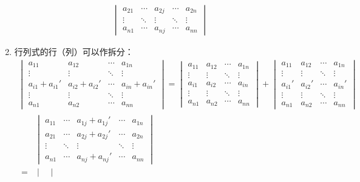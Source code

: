 \begin{property}
\begin{enumerate}
\begin{gather*}
\begin{vmatrix}
				a_{21} & \cdots & a_{2j} & \cdots & a_{2n} \\
				\vdots & \ddots & \vdots & \ddots & \vdots \\
				a_{n1} & \cdots & a_{nj} & \cdots & a_{nn}
			\end{vmatrix}
		\end{gather*}
		\item 行列式的行（列）可以作拆分：
		\begin{gather*}
			\begin{vmatrix}
				a_{11} & a_{12} & \cdots & a_{1n} \\
				\vdots & \vdots & \ddots & \vdots \\
				a_{i1}+a_{i1}' & a_{i2}+a_{i2}' & \cdots & a_{in}+a_{in}' \\
				\vdots & \vdots & \ddots & \vdots \\
				a_{n1} & a_{n2} & \cdots & a_{nn}
			\end{vmatrix}=
			\begin{vmatrix}
				a_{11} & a_{12} & \cdots & a_{1n} \\
				\vdots & \vdots & \ddots & \vdots \\
				a_{i1} & a_{i2} & \cdots & a_{in} \\
				\vdots & \vdots & \ddots & \vdots \\
				a_{n1} & a_{n2} & \cdots & a_{nn}
			\end{vmatrix}+
			\begin{vmatrix}
				a_{11} & a_{12} & \cdots & a_{1n} \\
				\vdots & \vdots & \ddots & \vdots \\
				a_{i1}' & a_{i2}' & \cdots & a_{in}' \\
				\vdots & \vdots & \ddots & \vdots \\
				a_{n1} & a_{n2} & \cdots & a_{nn}
			\end{vmatrix} \\
			\begin{aligned}
				&\begin{vmatrix}
					a_{11} & \cdots & a_{1j}+a_{1j}' & \cdots & a_{1n} \\
					a_{21} & \cdots & a_{2j}+a_{2j}' & \cdots & a_{2n} \\
					\vdots & \ddots & \vdots & \ddots & \vdots \\
					a_{n1} & \cdots & a_{nj}+a_{nj}' & \cdots & a_{nn}
				\end{vmatrix} \\
				=&
				\begin{vmatrix}

\end{vmatrix}
\end{aligned}
\end{gather*}
\end{enumerate}
\end{property}
